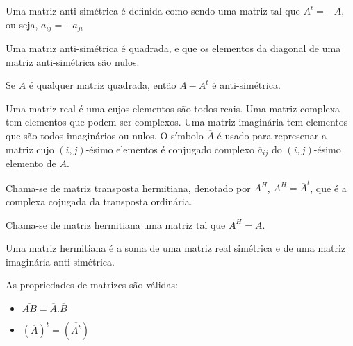 \documentclass[10pt,a4paper]{article}
\begin{document}
\begin{definition}
Uma matriz anti-simétrica é definida como sendo uma matriz tal que $A^t = -A$, ou seja, $a_{ij} = -a_{ji}$
\end{definition}

\begin{lemma}
Uma matriz anti-simétrica é quadrada, e que os elementos da diagonal de uma matriz anti-simétrica são nulos.
\end{lemma}

\begin{lemma}
Se $A$ é qualquer matriz quadrada, então $A-A^t$ é anti-simétrica.
\end{lemma}

\begin{definition}
Uma matriz real é uma cujos elementos são todos reais. Uma matriz complexa tem elementos que podem ser complexos. Uma matriz imaginária tem elementos que são todos imaginários ou nulos. O símbolo $\overline{A}$ é usado para represenar a matriz cujo $(i, j)$-ésimo elementos é conjugado complexo $\overline{a}_{ij}$ do $(i, j)$-ésimo elemento de $A$. 
\end{definition}

\begin{definition}
Chama-se de matriz transposta hermitiana, denotado por $A^H$, $A^H = \overline{A}^t$, que é a complexa cojugada da transposta ordinária.
\end{definition}

\begin{definition}
Chama-se de matriz hermitiana uma matriz tal que $A^H = A$.
\end{definition}

\begin{lemma}
Uma matriz hermitiana é a soma de uma matriz real simétrica e de uma matriz imaginária anti-simétrica.
\end{lemma}

\begin{lemma}
As propriedades de matrizes são válidas:
	\begin{itemize}
		\item $\overline{AB} = \overline{A}.\overline{B}$
		\item $(\overline{A})^t = (\overline{A^t})$
	\end{itemize}
\end{lemma}
\end{document}
